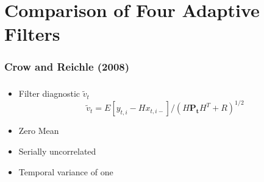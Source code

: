 \documentclass[mathserif]{beamer}
\begin{document}
\section{Comparison of Four Adaptive Filters}

\begin{frame}
  \frametitle{Crow and Reichle (2008)}
  \tableofcontents[currentsection]
\end{frame}

\begin{frame}
  \frametitle{\insertsection}
  \begin{itemize}
    \item Filter diagnostic $\tilde{v}_t$
    \begin{equation} \tilde{v}_t = E \left[ y_{t,i}-Hx_{t,i-} \right]/(H\mathbf{P_t}H^T+R)^{1/2}\end{equation}
    \item Zero Mean
    \item Serially uncorrelated
    \item Temporal variance of one
  \end{itemize}
\end{frame}



\end{document}
